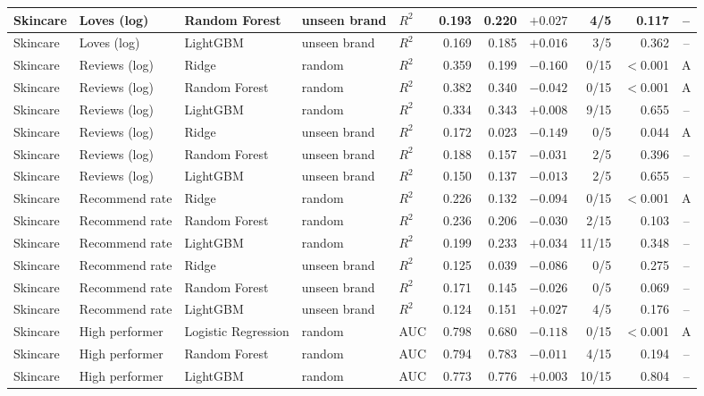 \begin{table}[htbp]
\begin{tabular}{|l|l|l|l|l|r|r|r|r|r|c|}
\hline
Skincare & Loves (log) & Random Forest & unseen brand & $R^2$ & 0.193 & 0.220 & $+0.027$ & 4/5 & 0.117 & -- \\
\hline
Skincare & Loves (log) & LightGBM & unseen brand & $R^2$ & 0.169 & 0.185 & $+0.016$ & 3/5 & 0.362 & -- \\
\hline
Skincare & Reviews (log) & Ridge & random & $R^2$ & 0.359 & 0.199 & $-0.160$ & 0/15 & $<$0.001 & A \\
\hline
Skincare & Reviews (log) & Random Forest & random & $R^2$ & 0.382 & 0.340 & $-0.042$ & 0/15 & $<$0.001 & A \\
\hline
Skincare & Reviews (log) & LightGBM & random & $R^2$ & 0.334 & 0.343 & $+0.008$ & 9/15 & 0.655 & -- \\
\hline
Skincare & Reviews (log) & Ridge & unseen brand & $R^2$ & 0.172 & 0.023 & $-0.149$ & 0/5 & 0.044 & A \\
\hline
Skincare & Reviews (log) & Random Forest & unseen brand & $R^2$ & 0.188 & 0.157 & $-0.031$ & 2/5 & 0.396 & -- \\
\hline
Skincare & Reviews (log) & LightGBM & unseen brand & $R^2$ & 0.150 & 0.137 & $-0.013$ & 2/5 & 0.655 & -- \\
\hline
Skincare & Recommend rate & Ridge & random & $R^2$ & 0.226 & 0.132 & $-0.094$ & 0/15 & $<$0.001 & A \\
\hline
Skincare & Recommend rate & Random Forest & random & $R^2$ & 0.236 & 0.206 & $-0.030$ & 2/15 & 0.103 & -- \\
\hline
Skincare & Recommend rate & LightGBM & random & $R^2$ & 0.199 & 0.233 & $+0.034$ & 11/15 & 0.348 & -- \\
\hline
Skincare & Recommend rate & Ridge & unseen brand & $R^2$ & 0.125 & 0.039 & $-0.086$ & 0/5 & 0.275 & -- \\
\hline
Skincare & Recommend rate & Random Forest & unseen brand & $R^2$ & 0.171 & 0.145 & $-0.026$ & 0/5 & 0.069 & -- \\
\hline
Skincare & Recommend rate & LightGBM & unseen brand & $R^2$ & 0.124 & 0.151 & $+0.027$ & 4/5 & 0.176 & -- \\
\hline
Skincare & High performer & Logistic Regression & random & AUC & 0.798 & 0.680 & $-0.118$ & 0/15 & $<$0.001 & A \\
\hline
Skincare & High performer & Random Forest & random & AUC & 0.794 & 0.783 & $-0.011$ & 4/15 & 0.194 & -- \\
\hline
Skincare & High performer & LightGBM & random & AUC & 0.773 & 0.776 & $+0.003$ & 10/15 & 0.804 & -- \\

\end{tabular}
\end{table}
